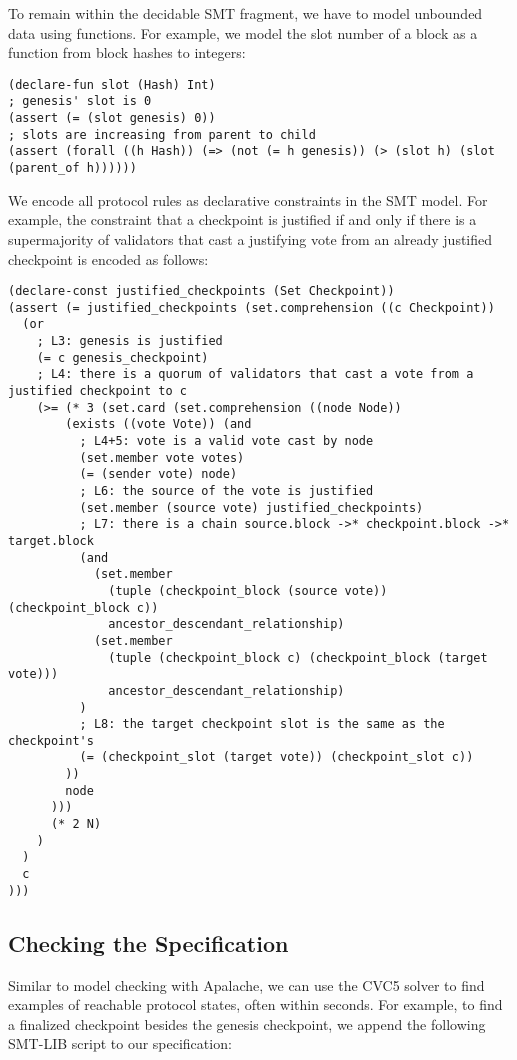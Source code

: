 To remain within the decidable SMT fragment, we have to model unbounded data
using functions. For example, we model the slot number of a block as a function
from block hashes to integers:

\begin{lstlisting}[language=smt]
(declare-fun slot (Hash) Int)
; genesis' slot is 0
(assert (= (slot genesis) 0))
; slots are increasing from parent to child
(assert (forall ((h Hash)) (=> (not (= h genesis)) (> (slot h) (slot (parent_of h))))))
\end{lstlisting}

We encode all protocol rules as declarative constraints in the SMT model. For
example, the constraint that a checkpoint is justified if and only if there is
a supermajority of validators that cast a justifying vote from an already
justified checkpoint is encoded as follows:

\begin{lstlisting}[language=smt]
(declare-const justified_checkpoints (Set Checkpoint))
(assert (= justified_checkpoints (set.comprehension ((c Checkpoint))
  (or
    ; L3: genesis is justified
    (= c genesis_checkpoint)
    ; L4: there is a quorum of validators that cast a vote from a justified checkpoint to c
    (>= (* 3 (set.card (set.comprehension ((node Node))
        (exists ((vote Vote)) (and
          ; L4+5: vote is a valid vote cast by node
          (set.member vote votes)
          (= (sender vote) node)
          ; L6: the source of the vote is justified
          (set.member (source vote) justified_checkpoints)
          ; L7: there is a chain source.block ->* checkpoint.block ->* target.block
          (and
            (set.member
              (tuple (checkpoint_block (source vote)) (checkpoint_block c))
              ancestor_descendant_relationship)
            (set.member
              (tuple (checkpoint_block c) (checkpoint_block (target vote)))
              ancestor_descendant_relationship)
          )
          ; L8: the target checkpoint slot is the same as the checkpoint's
          (= (checkpoint_slot (target vote)) (checkpoint_slot c))
        ))
        node
      )))
      (* 2 N)
    )
  )
  c
)))
\end{lstlisting}

\subsection{Checking the Specification}

Similar to model checking with Apalache, we can use the CVC5 solver to find
examples of reachable protocol states, often within seconds. For example, to
find a finalized checkpoint besides the genesis checkpoint, we append the
following SMT-LIB script to our specification:

